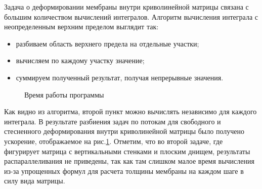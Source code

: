 Задача о деформировании мембраны внутри криволинейной матрицы связана с большим количеством вычислений интегралов. Алгоритм вычисления интеграла с неопределенным верхним пределом выглядит так:
\begin{itemize}
\item разбиваем область верхнего предела на отдельные участки;
\item вычисляем по каждому участку значение;
\item суммируем полученный результат, получая непрерывные значения.
\end{itemize}
		\begin{figure}[h!]
				\caption{ Время работы программы } 
				\label{parall_results}
	    \end{figure}

Как видно из алгоритма, второй пункт можно вычислять независимо для каждого интеграла. В результате разбиения задач по потокам для свободного и стесненного деформирования внутри криволинейной матрицы было получено ускорение, отображаемое на рис.\ref{parall_results}. Отметим, что во второй задаче, где фигурирует матрица с вертикальными стенками и плоским днищем, результаты распараллеливания не приведены, так как там слишком малое время вычисления из-за упрощенных формул для расчета толщины мембраны на каждом шаге в силу вида матрицы.

